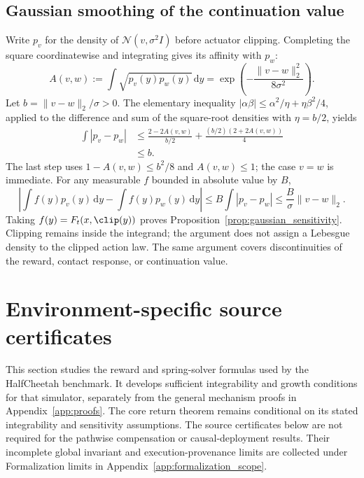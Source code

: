 \subsection{Gaussian smoothing of the continuation value}
\label{app:gaussian_sensitivity}

Write $p_v$ for the density of $\mathcal N(v,\sigma^2I)$ before actuator clipping.
Completing the square coordinatewise and integrating gives its affinity with $p_w$:
\begin{equation}
 A(v,w):=\int\sqrt{p_v(y)p_w(y)}\,\mathrm dy
 =\exp\!\left(-\frac{\|v-w\|_2^2}{8\sigma^2}\right).
\end{equation}
Let $b=\|v-w\|_2/\sigma>0$. The elementary inequality
$|\alpha\beta|\le\alpha^2/\eta+\eta\beta^2/4$, applied to the difference and sum of the square-root densities with $\eta=b/2$, yields
\begin{align}
 \int|p_v-p_w|
 &\le \frac{2-2A(v,w)}{b/2}
       +\frac{(b/2)(2+2A(v,w))}{4}\nonumber\\
 &\le b.
\end{align}
The last step uses $1-A(v,w)\le b^2/8$ and $A(v,w)\le1$; the case $v=w$ is immediate.
For any measurable $f$ bounded in absolute value by $B$,
\begin{equation}
 \left|\int f(y)p_v(y)\,\mathrm dy-\int f(y)p_w(y)\,\mathrm dy\right|
 \le B\int|p_v-p_w|
 \le \frac{B}{\sigma}\|v-w\|_2.
\end{equation}
Taking $f(y)=F_t(x,\clip(y))$ proves Proposition~\ref{prop:gaussian_sensitivity}.
Clipping remains inside the integrand; the argument does not assign a Lebesgue density to the clipped action law.
The same argument covers discontinuities of the reward, contact response, or continuation value.

\section{Environment-specific source certificates}
\label{app:environment_certificates}

This section studies the reward and spring-solver formulas used by the HalfCheetah benchmark.
It develops sufficient integrability and growth conditions for that simulator, separately from the general mechanism proofs in Appendix~\ref{app:proofs}.
The core return theorem remains conditional on its stated integrability and sensitivity assumptions.
The source certificates below are not required for the pathwise compensation or causal-deployment results.
Their incomplete global invariant and execution-provenance limits are collected under Formalization limits in Appendix~\ref{app:formalization_scope}.

